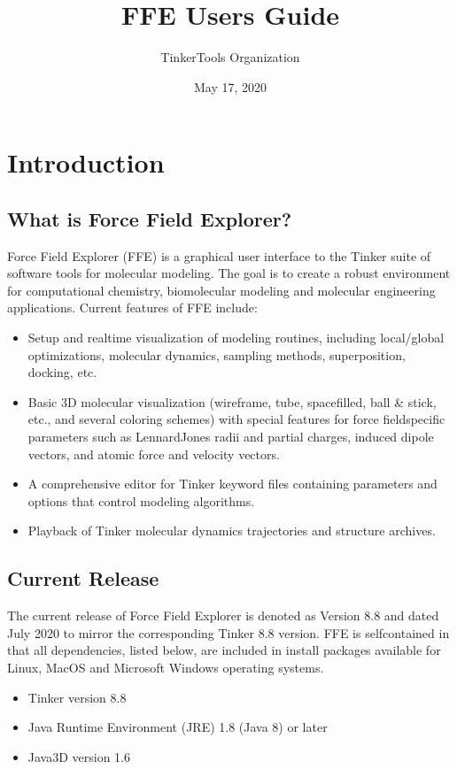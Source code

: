\documentclass[letterpaper,11pt,english]{sphinxmanual}
\title{FFE User\textquotesingle{}s Guide}
\date{May 17, 2020}
\author{TinkerTools Organization}
\begin{document}
\pagestyle{empty}
\sphinxmaketitle
\pagestyle{plain}
\sphinxtableofcontents
\pagestyle{normal}
\label{\detokenize{index::doc}}



\chapter{Introduction}
\label{\detokenize{text/introduction:introduction}}\label{\detokenize{text/introduction::doc}}

\section{What is Force Field Explorer?}
\label{\detokenize{text/introduction:what-is-force-field-explorer}}
Force Field Explorer (FFE) is a graphical user interface to the Tinker suite of software tools for molecular modeling. The goal is to create a robust environment for computational chemistry, biomolecular modeling and molecular engineering applications. Current features of FFE include:
\begin{itemize}
\item {} 
Setup and real\sphinxhyphen{}time visualization of modeling routines, including local/global optimizations, molecular dynamics, sampling methods, superposition, docking, etc.

\item {} 
Basic 3D molecular visualization (wireframe, tube, spacefilled, ball \& stick, etc., and several coloring schemes) with special features for force field\sphinxhyphen{}specific parameters such as Lennard\sphinxhyphen{}Jones radii and partial charges, induced dipole vectors, and atomic force and velocity vectors.

\item {} 
A comprehensive editor for Tinker keyword files containing parameters and options that control modeling algorithms.

\item {} 
Playback of Tinker molecular dynamics trajectories and structure archives.

\end{itemize}


\section{Current Release}
\label{\detokenize{text/introduction:current-release}}
The current release of Force Field Explorer is denoted as Version 8.8 and dated July 2020 to mirror the corresponding Tinker 8.8 version. FFE is self\sphinxhyphen{}contained in that all dependencies, listed below, are included in install packages available for Linux, MacOS and Microsoft Windows operating systems.
\begin{itemize}
\item {} 
Tinker version 8.8

\item {} 
Java Runtime Environment (JRE) 1.8 (Java 8) or later

\item {} 
Java3D version 1.6

\end{itemize}
\end{document}
